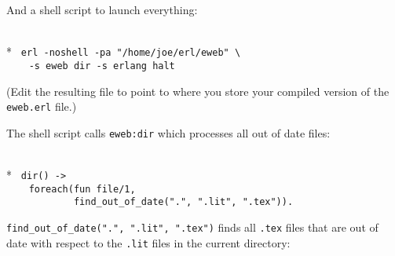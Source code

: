 And a shell script to launch everything: 

\begin{flushleft}
\label{eweb_start}
\\*
\tt
\noindent{}%
\verb&erl -noshell -pa "/home/joe/erl/eweb" \&\\
\noindent{}%
\verb&    -s eweb dir -s erlang halt&\\
\end{flushleft}

\noindent (Edit the resulting file to point to where you store your
compiled version of the \verb+eweb.erl+ file.)

The shell script calls \verb+eweb:dir+ which processes all out of date
files:

\begin{flushleft}
\label{utilities_5_8}
\\*
\tt
\noindent{}%
\verb&dir() -> &\\
\noindent{}%
\verb&    foreach(fun file/1, &\\
\noindent{}%
\verb&            find_out_of_date(".", ".lit", ".tex")).&\\
\end{flushleft}

    \verb+find_out_of_date(".", ".lit", ".tex")+ finds all \verb+.tex+
files that are out of date with respect to the \verb+.lit+ files in the
current directory:

